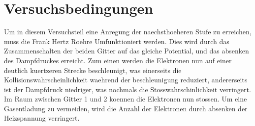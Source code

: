 \section{Versuchsbedingungen}\label{sec:Versuchsbedingungen}
Um in diesem Versuchsteil eine Anregung der naechsthoeheren Stufe zu erreichen, muss die Frank Hertz Roehre Umfunktioniert werden.
Dies wird durch das Zusammenschalten der beiden Gitter auf das gleiche Potential, und das absenken des Dampfdruckes erreicht.
Zum einen werden die Elektronen nun auf einer deutlich kuertzeren Strecke beschleunigt, was einerseits die Kollisionswahrscheinlichkeit waehrend der beschleunigung reduziert, andererseits ist der Dampfdruck niedriger, was nochmals die Stosswahrschinlichkeit verringert.
Im Raum zwischen Gitter 1 und 2 koennen die Elektronen nun stossen.
Um eine Gasentladung zu vermeiden, wird die Anzahl der Elektronen durch absenken der Heizspannung verringert.\\
